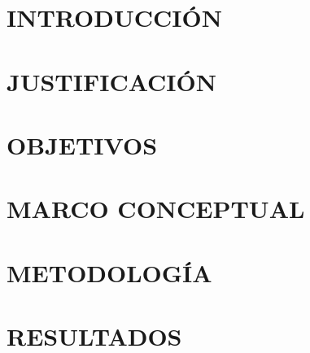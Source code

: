\documentclass[12pt]{article}
\begin{document}
\section{INTRODUCCIÓN}


%

\section{JUSTIFICACIÓN}


\noindent \begin{center}
\cleardoublepage{}
\par\end{center}

 

\section{OBJETIVOS}






%

%

\section{MARCO CONCEPTUAL}


\section{METODOLOGÍA}


\section{RESULTADOS}

\end{document}
